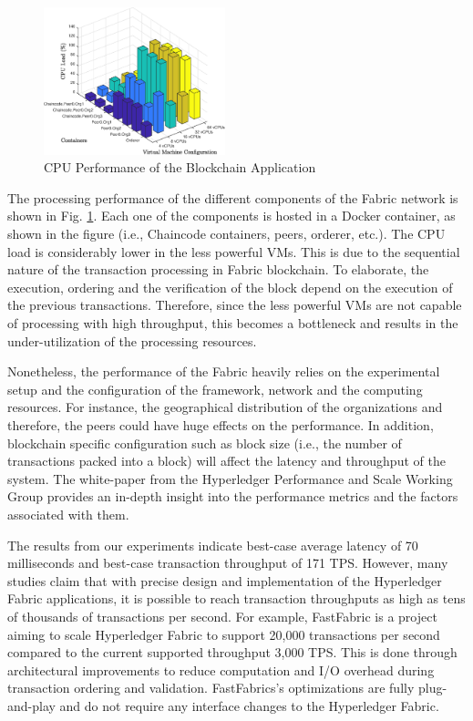 \documentclass[conference]{IEEEtran}
\begin{document}
\begin{figure}
    \centering
    \includegraphics[width=0.47\textwidth]{figs/cpu.eps}
    \vspace{1mm}
    \caption{CPU Performance of the Blockchain Application}
    \label{fig:cpu}
\end{figure}

The processing performance of the different components of the Fabric network is shown in Fig.  \ref{fig:cpu}. Each one of the components is hosted in a Docker container, as shown in the figure (i.e., Chaincode containers, peers, orderer, etc.). The CPU load is considerably lower in the less powerful VMs. This is due to the sequential nature of the transaction processing in Fabric blockchain. To elaborate, the execution, ordering and the verification of the block depend on the execution of the previous transactions. Therefore, since the less powerful VMs are not capable of processing with high throughput, this becomes a bottleneck and results in the under-utilization of the processing resources. 


Nonetheless, the performance of the Fabric heavily relies on the experimental setup and the configuration of the framework, network and the computing resources. For instance, the geographical distribution of the organizations and therefore, the peers could have huge effects on the performance. In addition, blockchain specific configuration such as block size (i.e., the number of transactions packed into a block) \cite{DBLP:journals/corr/abs-1805-11390} will affect the latency and throughput of the system. The white-paper \cite{hgperf} from the Hyperledger Performance and Scale Working Group \cite{pswg} provides an in-depth insight into the performance metrics and the factors associated with them.

The results from our experiments indicate best-case average latency of 70 milliseconds and best-case transaction throughput of 171 TPS. However, many studies claim that with precise design and implementation of the Hyperledger Fabric applications, it is possible to reach transaction throughputs as high as tens of thousands of transactions per second. For example, FastFabric \cite{fastFabric} is a project aiming to scale Hyperledger Fabric to support 20,000 transactions per second compared to the current supported throughput 3,000 TPS. This is done through architectural improvements to reduce computation and I/O overhead during transaction ordering and validation. FastFabrics's optimizations are fully plug-and-play and do not require any interface changes to the Hyperledger Fabric.
\end{document}
